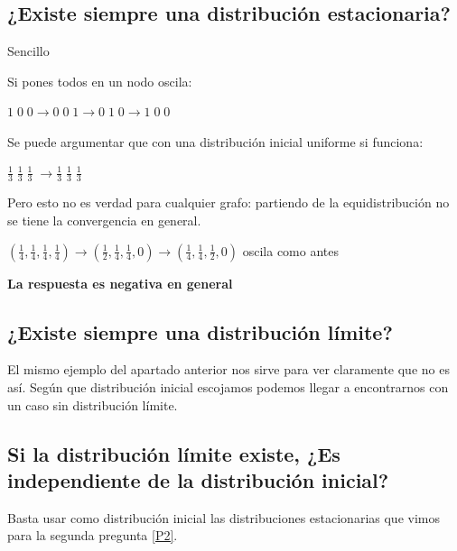 \subsection{¿Existe siempre una distribución estacionaria?}

\begin{example}{Sencillo}

	\begin{center}
		\centering
	\end{center}

	Si pones todos en un nodo oscila:

	$1\; 0\; 0 \rightarrow 0\; 0\; 1 \rightarrow 0\; 1\; 0 \rightarrow 1\; 0\; 0$

	Se puede argumentar que con una distribución inicial uniforme si funciona:

	$\frac{1}{3} \; \frac{1}{3} \; \frac{1}{3} \; \rightarrow \frac{1}{3} \; \frac{1}{3} \; \frac{1}{3} \; $

	Pero esto no es verdad para cualquier grafo: partiendo de la equidistribución no se tiene la convergencia en general.

	\begin{center}
		\centering
	\end{center}


	$(\frac{1}{4},\frac{1}{4},\frac{1}{4},\frac{1}{4}) \rightarrow (\frac{1}{2},\frac{1}{4},\frac{1}{4}, 0) \rightarrow (\frac{1}{4},\frac{1}{4},\frac{1}{2},0)$ oscila como antes

	\textbf{La respuesta es negativa en general}

\end{example}

\subsection {¿Existe siempre una distribución límite?}
El mismo ejemplo del apartado anterior nos sirve para ver claramente que no es así. Según que distribución inicial escojamos podemos llegar a encontrarnos con un caso sin distribución límite.

\subsection {Si la distribución límite existe, ¿Es independiente de la distribución inicial?}


Basta usar como distribución inicial las distribuciones estacionarias que vimos para la segunda pregunta \ref{P2}.

